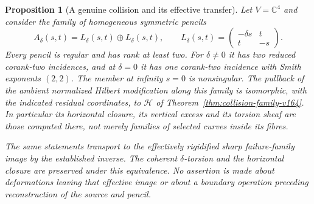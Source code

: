 \documentclass[11pt,reqno]{amsart}
\numberwithin{equation}{section}
\newtheorem{proposition}[theorem]{Proposition}
\theoremstyle{definition}\newtheorem{definition}[theorem]{Definition}
\theoremstyle{remark}\newtheorem{remark}[theorem]{Remark}
\newcommand{\C}{\mathbb C}\newcommand{\Q}{\mathbb Q}
\begin{document}
\begin{proposition}[A genuine collision and its effective transfer]
\label{prop:genuine-collision-v164}
Let $V=\C^4$ and consider the family of homogeneous symmetric pencils
\begin{equation}\label{eq:genuine-collision-v164}
 A_\delta(s,t)=L_\delta(s,t)\oplus L_\delta(s,t),\qquad
 L_\delta(s,t)=
 \begin{pmatrix}-\delta s&t\\t&-s\end{pmatrix}.
\end{equation}
Every pencil is regular and has rank at least two. For $\delta\ne0$
it has two reduced corank-two incidences, and at $\delta=0$ it has
one corank-two incidence with Smith exponents $(2,2)$. The member
at infinity $s=0$ is nonsingular. The pullback of the ambient
normalized Hilbert modification along this family is isomorphic,
with the indicated residual coordinates, to $\mathcal H$ of
Theorem~\ref{thm:collision-family-v164}. In particular its horizontal
closure, its vertical excess and its torsion sheaf are those computed
there, not merely families of selected curves inside its fibres.

The same statements transport to the effectively rigidified sharp
failure-family image by the established inverse. The coherent
$\delta$-torsion and the horizontal closure are preserved under this
equivalence. No assertion is made about deformations leaving that
effective image or about a boundary operation preceding reconstruction
of the source and pencil.
\end{proposition}
\end{document}
